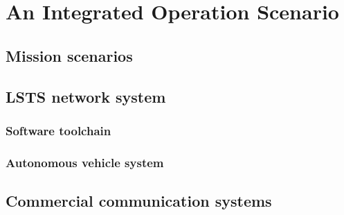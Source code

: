 %
%
%


\chapter{An Integrated Operation Scenario}
\label{chp:NetworkOp}


\section{Mission scenarios}
\label{sec:NetworkOp_Scenarios}

 {\small\textit{\lipsum[1-2]}}


\section{LSTS network system}
\label{sec:NetworkOp_LSTS}

 {\small\textit{\lipsum[1-2]}}

\subsection{Software toolchain}

 {\small\textit{\lipsum[1-2]}}

\subsection{Autonomous vehicle system}

 {\small\textit{\lipsum[1-2]}}


\section{Commercial communication systems}
\label{sec:NetworkOp_CommercialComms}


